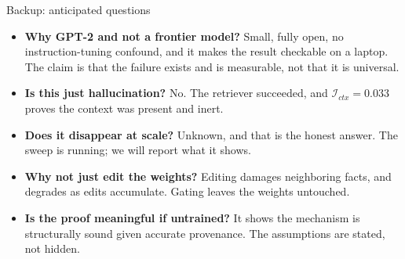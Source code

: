 \documentclass[aspectratio=169]{beamer}
\begin{document}
\begin{frame}{Backup: anticipated questions}
  \vspace{0.2cm}
  \small
  \begin{itemize}\setlength\itemsep{0.75em}
    \item \textbf{Why GPT-2 and not a frontier model?} Small, fully open, no
          instruction-tuning confound, and it makes the result checkable on a laptop.
          The claim is that the failure exists and is measurable, not that it is universal.
    \item \textbf{Is this just hallucination?} No. The retriever succeeded, and
          $\mathcal{I}_{ctx} = 0.033$ proves the context was present and inert.
    \item \textbf{Does it disappear at scale?} Unknown, and that is the honest answer.
          The sweep is running; we will report what it shows.
    \item \textbf{Why not just edit the weights?} Editing damages neighboring facts,
          and degrades as edits accumulate. Gating leaves the weights untouched.
    \item \textbf{Is the proof meaningful if untrained?} It shows the mechanism is
          structurally sound given accurate provenance. The assumptions are stated,
          not hidden.
  \end{itemize}
\end{frame}
\end{document}
